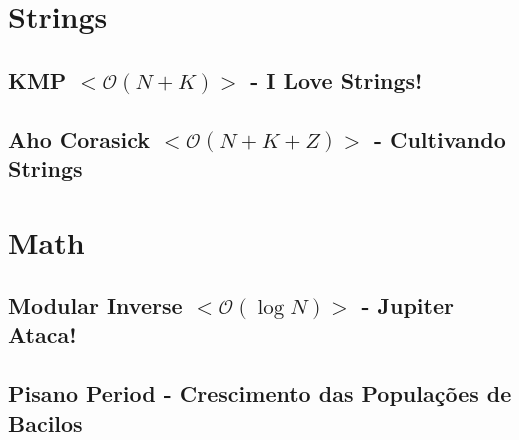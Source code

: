 \documentclass[11pt, a4paper, twoside, notitlepage]{article}
\begin{document}
\begin{titlepage}
\maketitle
\tableofcontents
\alignbottom{\doclicenseThis}
\end{titlepage}


%
%
%
%

\section{Strings}

\subsection{KMP $<\mathcal{O}(N+K)>$ - I Love Strings!}



\subsection{Aho Corasick $<\mathcal{O}(N+K+Z)>$ - Cultivando Strings}



\newpage

\section{Math}

\subsection{Modular Inverse $<\mathcal{O}(\log N)>$ - Jupiter Ataca!}



\subsection{Pisano Period - Crescimento das Populações de Bacilos}
\end{document}

